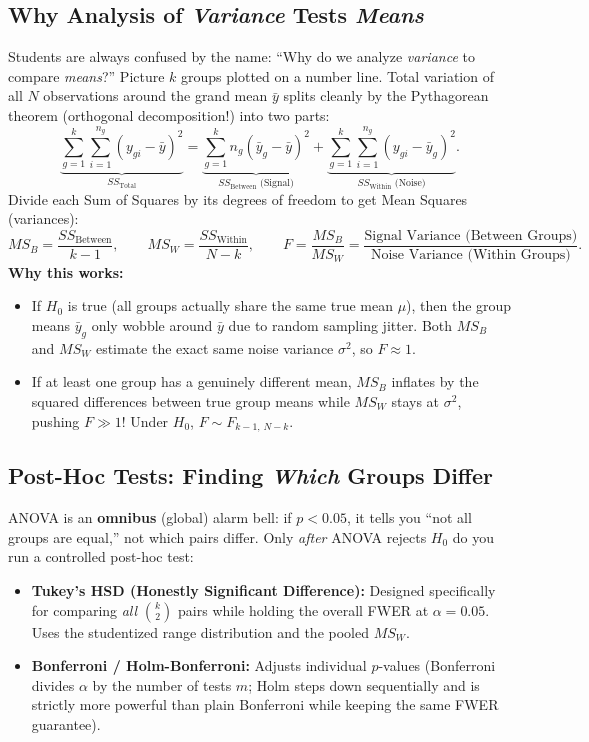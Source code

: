 \documentclass[11pt, a4paper]{article}
\begin{document}
\subsection{Why Analysis of \emph{Variance} Tests \emph{Means}}
Students are always confused by the name: ``Why do we analyze \emph{variance} to compare \emph{means}?'' Picture $k$ groups plotted on a number line. Total variation of all $N$ observations around the grand mean $\bar{y}$ splits cleanly by the Pythagorean theorem (orthogonal decomposition!) into two parts:
\[
    \underbrace{\sum_{g=1}^k \sum_{i=1}^{n_g} (y_{gi} - \bar{y})^2}_{SS_{\text{Total}}}
    =
    \underbrace{\sum_{g=1}^k n_g (\bar{y}_g - \bar{y})^2}_{SS_{\text{Between}} \text{ (Signal)}}
    +
    \underbrace{\sum_{g=1}^k \sum_{i=1}^{n_g} (y_{gi} - \bar{y}_g)^2}_{SS_{\text{Within}} \text{ (Noise)}}.
\]
Divide each Sum of Squares by its degrees of freedom to get Mean Squares (variances):
\[
    MS_B = \frac{SS_{\text{Between}}}{k - 1},
    \qquad
    MS_W = \frac{SS_{\text{Within}}}{N - k},
    \qquad
    F = \frac{MS_B}{MS_W} = \frac{\text{Signal Variance (Between Groups)}}{\text{Noise Variance (Within Groups)}}.
\]
\textbf{Why this works:}
\begin{itemize}
    \item If $H_0$ is true (all groups actually share the same true mean $\mu$), then the group means $\bar{y}_g$ only wobble around $\bar{y}$ due to random sampling jitter. Both $MS_B$ and $MS_W$ estimate the exact same noise variance $\sigma^2$, so $F \approx 1$.
    \item If at least one group has a genuinely different mean, $MS_B$ inflates by the squared differences between true group means while $MS_W$ stays at $\sigma^2$, pushing $F \gg 1$! Under $H_0$, $F \sim F_{k-1,\, N-k}$.
\end{itemize}

\subsection{Post-Hoc Tests: Finding \emph{Which} Groups Differ}
ANOVA is an \textbf{omnibus} (global) alarm bell: if $p < 0.05$, it tells you ``not all groups are equal,'' not which pairs differ. Only \emph{after} ANOVA rejects $H_0$ do you run a controlled post-hoc test:
\begin{itemize}
    \item \textbf{Tukey's HSD (Honestly Significant Difference):} Designed specifically for comparing \emph{all} $\binom{k}{2}$ pairs while holding the overall FWER at $\alpha = 0.05$. Uses the studentized range distribution and the pooled $MS_W$.
    \item \textbf{Bonferroni / Holm-Bonferroni:} Adjusts individual $p$-values (Bonferroni divides $\alpha$ by the number of tests $m$; Holm steps down sequentially and is strictly more powerful than plain Bonferroni while keeping the same FWER guarantee).
\end{itemize}
\end{document}
